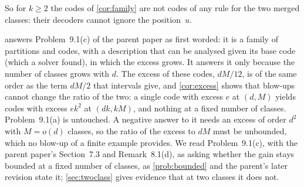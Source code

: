 So for $k\ge2$ the codes of \cref{cor:family} are not codes of any rule for the two merged classes: their decoders cannot
ignore the position~$u$.

 answers Problem~9.1(c) of the parent paper as first worded: it is a family of partitions and codes, with a
description that can be analysed given its base code (which a solver found), in which the excess grows. It answers it
only because the number of classes grows with $d$. The excess of these codes, $dM/12$, is of the same order as the term
$dM/2$ that intervals give, and \cref{cor:excess} shows that blow-ups cannot change the ratio of the two: a single code
with excess $e$ at $(d,M)$ yields codes with excess $ek^2$ at $(dk,kM)$, and nothing at a fixed number of classes.
Problem~9.1(a) is untouched. A negative answer to it needs an excess of order $d^2$ with $M=o(d)$ classes, so the ratio
of the excess to $dM$ must be unbounded, which no blow-up of a finite example provides. We read Problem~9.1(c), with
the parent paper's Section~7.3 and Remark~8.1(d), as asking whether the gain stays bounded at a fixed number of
classes, as \cref{prob:bounded} and the parent's later revision state it; \cref{sec:twoclass} gives evidence that at
two classes it does not.
